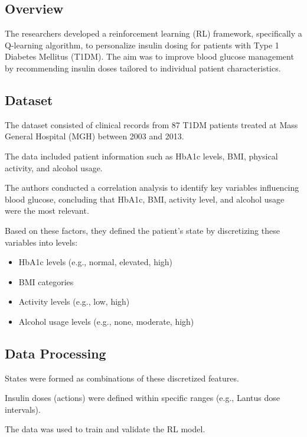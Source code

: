 \subsection*{Overview}
The researchers developed a reinforcement learning (RL) framework, specifically a Q-learning algorithm, to personalize insulin dosing for patients with Type 1 Diabetes Mellitus (T1DM). The aim was to improve blood glucose management by recommending insulin doses tailored to individual patient characteristics.

\subsection*{Dataset}
The dataset consisted of clinical records from 87 T1DM patients treated at Mass General Hospital (MGH) between 2003 and 2013.

The data included patient information such as HbA1c levels, BMI, physical activity, and alcohol usage.

The authors conducted a correlation analysis to identify key variables influencing blood glucose, concluding that HbA1c, BMI, activity level, and alcohol usage were the most relevant.

Based on these factors, they defined the patient’s state by discretizing these variables into levels:
    \begin{itemize}
        \item HbA1c levels (e.g., normal, elevated, high)
        \item BMI categories
        \item Activity levels (e.g., low, high)
        \item Alcohol usage levels (e.g., none, moderate, high)
    \end{itemize}

\subsection*{Data Processing}
States were formed as combinations of these discretized features.

Insulin doses (actions) were defined within specific ranges (e.g., Lantus dose intervals).

The data was used to train and validate the RL model.

